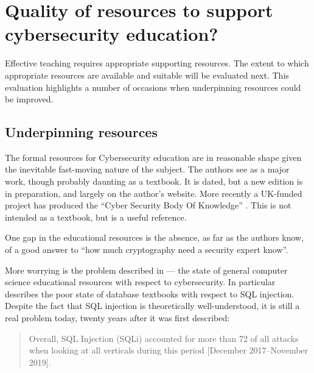 \documentclass[conference]{IEEEtran}
\begin{document}

\section{Quality of resources to support cybersecurity education?}
Effective teaching requires appropriate supporting resources. The extent to which appropriate resources are available and suitable will be evaluated next. This evaluation highlights a number of occasions when underpinning resources could be improved. 
\subsection{Underpinning resources}
The formal resources for Cybersecurity education are in reasonable shape given the inevitable fast-moving nature of the subject. The authors see \cite{Anderson2008} as a major work, though probably daunting as a textbook. It is dated, but a new edition is in preparation, and largely on the author's website. More recently a UK-funded project has produced the ``Cyber Security Body Of Knowledge'' \cite{Bristol2019a}. This is not intended as a textbook, but is a useful reference.

One gap in the educational resources is the absence, as far as the authors know, of a good answer to ``how much cryptography need a security expert know''. 

More worrying is the problem described in \cite[\S IV.B]{Cricketal2019} --- the state of general computer science educational resources with respect to cybersecurity. In particular \cite{Drop2019} describes the poor state of database textbooks with respect to SQL injection.  Despite the fact that SQL injection is theoretically well-understood, it is still a real problem today, twenty years after it was first described: 
\begin{quote}
Overall,
SQL Injection (SQLi) accounted for more than 72%
of all attacks when looking at all verticals during this
period [December 2017--November 2019]. \cite{Akamai2020a}
\end{quote}
\end{document}
